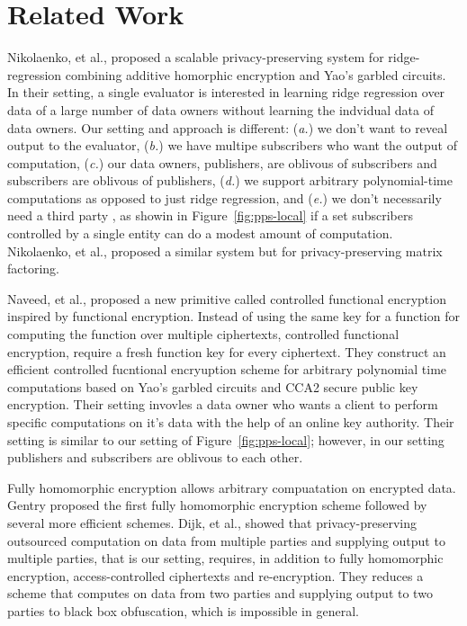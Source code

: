 \section{Related Work}
\label{sec:related}

Nikolaenko, et al.,\cite{nikolaenko2013privacy} proposed a scalable
privacy-preserving system for ridge-regression combining additive homorphic
encryption and Yao's garbled circuits.  In their setting, a single evaluator is
interested in learning ridge regression over data of a large number of data
owners without learning the indvidual data of data owners. Our setting and
approach is different: (\emph{a.}) we don't want to reveal output to the
evaluator, (\emph{b.}) we have multipe subscribers who want the output of
computation, (\emph{c.}) our data owners, publishers, are oblivous of
subscribers and subscribers are oblivous of publishers, (\emph{d.}) we support
arbitrary polynomial-time computations as opposed to just ridge regression, and
(\emph{e.}) we don't necessarily need a third party \garbler, as showin in
Figure~\ref{fig:pps-local} if a set subscribers controlled by a single entity
can do a modest amount of computation. Nikolaenko, et
al.,\cite{nikolaenko2013privacy} proposed a similar system but for
privacy-preserving matrix factoring.

Naveed, et al.,\cite{naveed2014controlled} proposed a new primitive called
controlled functional encryption inspired by functional encryption. Instead of
using the same key for a function for computing the function over multiple
ciphertexts, controlled functional encryption, require a fresh function key for
every ciphertext. They construct an efficient controlled fucntional encryuption
scheme for arbitrary polynomial time computations based on Yao's garbled
circuits and CCA2 secure public key encryption. Their setting invovles a data
owner who wants a client to perform specific computations on it's data with the
help of an online key authority. Their setting is similar to our setting of
Figure~\ref{fig:pps-local}; however, in our setting publishers and subscribers
are oblivous to each other.

Fully homomorphic encryption allows arbitrary compuatation on encrypted data.
Gentry proposed the first fully homomorphic encryption
scheme\cite{brakerski2011fully,gentry2009fully} followed by several more
efficient schemes\cite{brakerski2014leveled}. Dijk, et
al.,\cite{van2010impossibility} showed that privacy-preserving outsourced
computation on data from multiple parties and supplying output to multiple
parties, that is our setting, requires, in addition to fully homomorphic
encryption, access-controlled ciphertexts and re-encryption. They reduces a
scheme that computes on data from two parties and supplying output to two
parties to black box obfuscation, which is impossible in
general\cite{barak2001possibility}.
